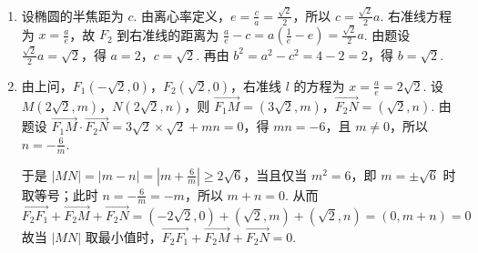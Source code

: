 \begin{solution}
\begin{enumerate}
\item 设椭圆的半焦距为 \(c\). 由离心率定义，\(e=\frac{c}{a}=\frac{\sqrt{2}}{2}\)，所以 \(c=\frac{\sqrt{2}}{2}a\). 右准线方程为 \(x=\frac{a}{e}\)，故 \(F_{2}\) 到右准线的距离为 \(\frac{a}{e}-c=a\left(\frac1e-e\right)=\frac{\sqrt{2}}{2}a\). 由题设 \(\frac{\sqrt{2}}{2}a=\sqrt{2}\)，得 \(a=2\)，\(c=\sqrt{2}\). 再由 \(b^{2}=a^{2}-c^{2}=4-2=2\)，得 \(b=\sqrt{2}\).
\item 由上问，\(F_{1}(-\sqrt{2},0)\)，\(F_{2}(\sqrt{2},0)\)，右准线 \(l\) 的方程为 \(x=\frac{a}{e}=2\sqrt{2}\). 设 \(M(2\sqrt{2},m)\)，\(N(2\sqrt{2},n)\)，则 \(\overrightarrow{F_{1}M}=(3\sqrt{2},m)\)，\(\overrightarrow{F_{2}N}=(\sqrt{2},n)\). 由题设
\(\overrightarrow{F_{1}M}\cdot\overrightarrow{F_{2}N}=3\sqrt{2}\times\sqrt{2}+mn=0\)，得 \(mn=-6\)，且 \(m\neq0\)，所以 \(n=-\frac{6}{m}\).

于是 \(|MN|=|m-n|=\left|m+\frac{6}{m}\right|\geqslant2\sqrt{6}\)，当且仅当 \(m^{2}=6\)，即 \(m=\pm\sqrt{6}\) 时取等号；此时 \(n=-\frac{6}{m}=-m\)，所以 \(m+n=0\). 从而
\[
\overrightarrow{F_{2}F_{1}}+\overrightarrow{F_{2}M}+\overrightarrow{F_{2}N}=(-2\sqrt{2},0)+(\sqrt{2},m)+(\sqrt{2},n)=(0,m+n)=0
\]
故当 \(|MN|\) 取最小值时，\(\overrightarrow{F_{2}F_{1}}+\overrightarrow{F_{2}M}+\overrightarrow{F_{2}N}=0\).
\end{enumerate}
\end{solution}
